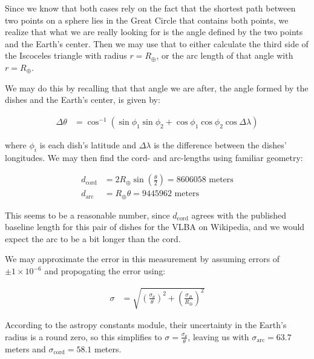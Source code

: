 \documentclass[12pt]{article}
\begin{document}
\begin{onehalfspacing}
\bigskip
\bigskip

Since we know that both cases rely on the fact that the shortest path between two points on a sphere lies in the Great Circle that contains both points, we realize that what we are really looking for is the angle defined by the two points and the Earth's center. Then we may use that to either calculate the third side of the Iscoceles triangle with radius $r = R_{\oplus}$, or the arc length of that angle with $r = R_{\oplus}$.

We may do this by recalling that that angle we are after, the angle formed by the dishes and the Earth's center, is given by:

\begin{align*}
  \Delta \theta &= \cos^{-1} \left( \sin{\phi_1} \sin{\phi_2} + \cos{\phi_1} \cos{\phi_2} \cos{\Delta \lambda} \right)
\end{align*}

where $\phi_i$ is each dish's latitude and $\Delta \lambda$ is the difference between the dishes' longitudes. We may then find the cord- and arc-lengths using familiar geometry:

\begin{align*}
  d_{\text{cord}} &= 2 R_{\oplus} \sin(\frac{\theta}{2}) = 8606058 \text{ meters}\\
  d_{\text{arc}} &= R_{\oplus} \theta = 9445962 \text{ meters}
\end{align*}

\bigskip
\bigskip

This seems to be a reasonable number, since $d_{\text{cord}}$ agrees with the published baseline length for this pair of dishes for the VLBA on Wikipedia, and we would expect the arc to be a bit longer than the cord.

We may approximate the error in this measurement by assuming errors of $\pm 1 \times 10^{-6}$ and propogating the error using:

\begin{align*}
  \sigma &= \sqrt{ \left(\frac{\sigma_{\theta}}{\theta}\right)^2 + \left(\frac{\sigma_{R}}{R_{\oplus}}\right)^2}
\end{align*}

According to the astropy constants module, their uncertainty in the Earth's radius is a round zero, so this simplifies to $\sigma = \frac{\sigma_{\theta}}{\theta}$, leaving us with $\sigma_{\text{arc}} = 63.7$ meters and $\sigma_{\text{cord}} = 58.1$ meters.

\bigskip
\bigskip


\end{onehalfspacing}
\end{document}
